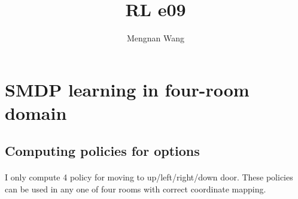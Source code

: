 \documentclass[]{article}
\title{RL e09}
\author{Mengnan Wang}
\begin{document}
\maketitle

\section{SMDP learning in four-room domain}
\subsection{Computing policies for options}
\paragraph{}I only compute 4 policy for moving to up/left/right/down door.
These policies can be used in any one of four rooms with correct coordinate mapping.
\end{document}

